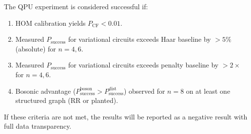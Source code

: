 The QPU experiment is considered successful if:
\begin{enumerate}
\item HOM calibration yields $P_{\mathrm{CF}} < 0.01$.
\item Measured $P_{\mathrm{success}}$ for variational circuits exceeds Haar baseline by $>5\%$ (absolute) for $n=4,6$.
\item Measured $P_{\mathrm{success}}$ for variational circuits exceeds penalty baseline by $>2\times$ for $n=4,6$.
\item Bosonic advantage ($P_{\mathrm{success}}^{\mathrm{boson}} > P_{\mathrm{success}}^{\mathrm{dist}}$) observed for $n=8$ on at least one structured graph (RR or planted).
\end{enumerate}

If these criteria are not met, the results will be reported as a negative result with full data transparency.
